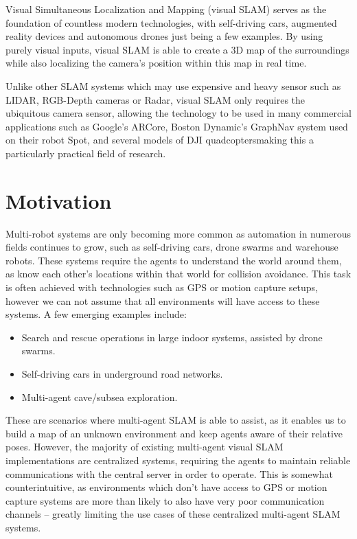 
\label{sec:introduction}
Visual Simultaneous Localization and Mapping (visual SLAM) serves as the foundation of countless modern technologies, with self-driving cars, augmented reality devices and autonomous drones just being a few examples. By using purely visual inputs, visual SLAM is able to create a 3D map of the surroundings while also localizing the camera's position within this map in real time.

Unlike other SLAM systems which may use expensive and heavy sensor such as LIDAR, RGB-Depth cameras or Radar, visual SLAM only requires the ubiquitous camera sensor, allowing the technology to be used in many commercial applications such as Google's ARCore\footnotemark[1], Boston Dynamic's GraphNav system used on their robot Spot\footnotemark[2], and several models of DJI quadcopters\footnotemark[3] making this a particularly practical field of research.


\section{Motivation}
\label{sec:motivation}
Multi-robot systems are only becoming more common as automation in numerous fields continues to grow, such as self-driving cars, drone swarms and warehouse robots. These systems require the agents to understand the world around them, as know each other's locations within that world for collision avoidance. This task is often achieved with technologies such as GPS or motion capture setups, however we can not assume that all environments will have access to these systems. A few emerging examples include: \noparskip
\smallbreak

{
    \begin{itemize}[nosep]
        \item Search and rescue operations in large indoor systems, assisted by drone swarms.
        \item Self-driving cars in underground road networks.
        \item Multi-agent cave/subsea exploration.
    \end{itemize}
}

These are scenarios where multi-agent SLAM is able to assist, as it enables us to build a map of an unknown environment and keep agents aware of their relative poses. However, the majority of existing multi-agent visual SLAM implementations are centralized systems, requiring the agents to maintain reliable communications with the central server in order to operate. This is somewhat counterintuitive, as environments which don't have access to GPS or motion capture systems are more than likely to also have very poor communication channels -- greatly limiting the use cases of these centralized multi-agent SLAM systems.

